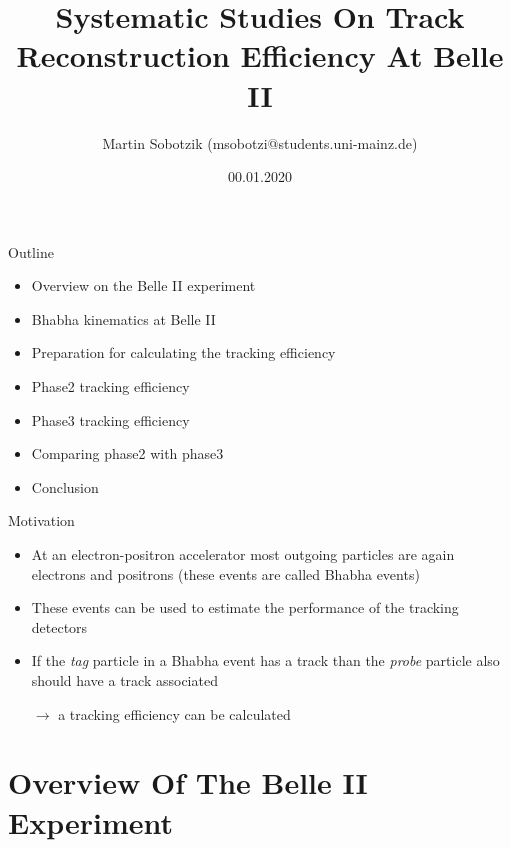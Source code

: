 \documentclass[8pt]{beamer}
\title{Systematic Studies On Track Reconstruction Efficiency At Belle II}
\date{00.01.2020}
\author{Martin Sobotzik (msobotzi@students.uni-mainz.de)}
\institute{Johannes Gutenberg-Universit\"at Mainz}
\begin{document}
\maketitle
%


\newcommand{\boundellipse}[3]%
{(#1) ellipse (#2 and #3)
}

\begin{frame}{Outline}




	\begin{itemize}
		\item Overview on the Belle II experiment
		\item Bhabha kinematics at Belle II
		\item Preparation for calculating the tracking efficiency
		\item Phase2 tracking efficiency
		\item Phase3 tracking efficiency
		\item Comparing phase2 with phase3
		\item Conclusion
		
		
	\end{itemize}
\end{frame}



\begin{frame}{Motivation}
	\begin{itemize}
		\item At an electron-positron accelerator most outgoing particles are again electrons and positrons (these events are called Bhabha events)
		\item These events can be used to estimate the performance of the tracking detectors
		\item If the \textit{tag} particle in a Bhabha event has a track than the \textit{probe} particle also should have a track associated 
		
		$\rightarrow$ a tracking efficiency can be calculated
	\end{itemize}
\end{frame}


\section{Overview Of The Belle II Experiment}
\end{document}
